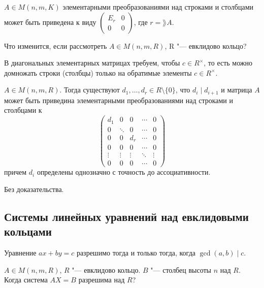 \begin{conseq}
	$A \in M(n, m, K)$ элементарными преобразованиями над строками и столбцами может быть приведена к виду
	$\begin{pmatrix} E_r & 0 \\ 0 & 0 \end{pmatrix}$, где $r = \rang A$.
\end{conseq}

Что изменится, если рассмотреть $A \in M(n, m, R)$, R "--- евклидово кольцо?

В диагональных элементарных матрицах требуем, чтобы $c \in R^{\times}$,
то есть можно домножать строки (столбцы) только на обратимые элементы $c \in R^{\times}$.

\begin{theorem}
	$A \in M(n, m, R)$.
	Тогда существуют $d_1, \dots, d_r \in R\setminus \{0\}$, что $d_i \mid d_{i+1}$
	и матрица $A$ может быть приведина элементарными преобразованиями над строками и столбцами к
	\[
		\begin{pmatrix}
			d_1 & 0 & 0 & \cdots & 0 \\
			0 & \ddots & 0 & \cdots & 0 \\
			0 & 0 & d_r & \cdots & 0 \\
			0 & 0 & 0 & \cdots & 0 \\
			\vdots&\vdots&\vdots&\ddots&\vdots \\
			0 & 0 & 0 & \cdots & 0
		\end{pmatrix}
	\]
	причем $d_i$ определены однозначно с точность до ассоциативности.
\end{theorem}

Без доказательства.

\subsection{Системы линейных уравнений над евклидовыми кольцами}

Уравнение $ax + by = c$ разрешимо тогда и только тогда, когда $\gcd(a, b) \mid c$.

$A \in M(n, m, R)$, $R$ "--- евклидово кольцо.
$B$ "--- столбец высоты $n$ над $R$.
Когда система $AX = B$ разрешима над $R$?

